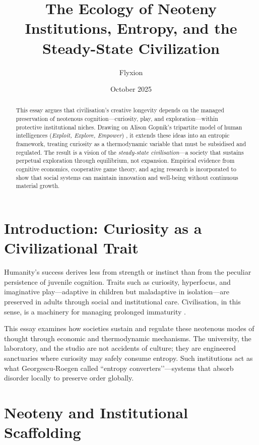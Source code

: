 \documentclass[12pt,a4paper]{article}
\title{\Huge\textbf{The Ecology of Neoteny}\\[0.5em]
       \Large Institutions, Entropy, and the Steady-State Civilization}
\author{Flyxion}
\date{October 2025}
\begin{document}
\maketitle

\begin{abstract}
This essay argues that civilisation’s creative longevity depends on the managed preservation 
of neotenous cognition---curiosity, play, and exploration---within protective institutional 
niches. Drawing on Alison Gopnik’s tripartite model of human intelligences 
(\emph{Exploit, Explore, Empower}) \citep{gopnik2025evolution,gopnik2016gardener},
it extends these ideas into an entropic framework, 
treating curiosity as a thermodynamic variable that must be subsidised and regulated. 
The result is a vision of the \emph{steady-state civilisation}---a society that sustains 
perpetual exploration through equilibrium, not expansion. 
Empirical evidence from cognitive economics, cooperative game theory, and aging research 
is incorporated to show that social systems can maintain innovation and well-being 
without continuous material growth.
\end{abstract}

\section{Introduction: Curiosity as a Civilizational Trait}

Humanity’s success derives less from strength or instinct than from 
the peculiar persistence of juvenile cognition. 
Traits such as curiosity, hyperfocus, and imaginative play---adaptive in children but 
maladaptive in isolation---are preserved in adults through social and institutional care.
Civilisation, in this sense, is a machinery for managing prolonged immaturity
\citep{gopnik2016gardener}.

This essay examines how societies sustain and regulate 
these neotenous modes of thought through economic and thermodynamic mechanisms. 
The university, the laboratory, and the studio are not accidents of culture; 
they are engineered sanctuaries where curiosity may safely consume entropy.
Such institutions act as 
what Georgescu-Roegen \citep{georgescu1971entropy} called ``entropy converters’’---systems that 
absorb disorder locally to preserve order globally.

\section{Neoteny and Institutional Scaffolding}
\end{document}

